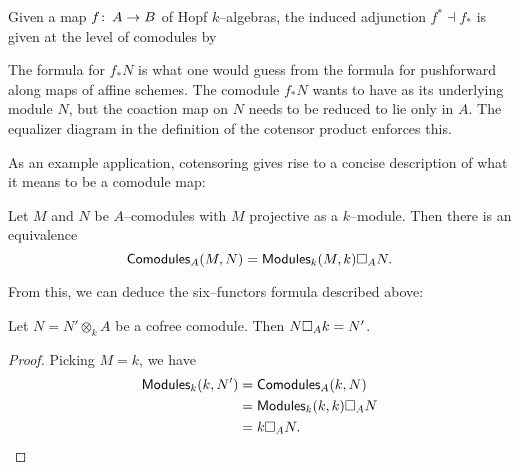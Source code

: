 \begin{lemma}
Given a map $f \colon\thinspace A \to B$ of Hopf $k$--algebras, the induced adjunction $f^* \dashv f_*$ is given at the level of comodules by
\begin{center}
\end{center}
\end{lemma}

\begin{remark}
The formula for $f_* N$ is what one would guess from the formula for pushforward along maps of affine schemes.  The comodule $f_* N$ wants to have as its underlying module $N$, but the coaction map on $N$ needs to be reduced to lie only in $A$.  The equalizer diagram in the definition of the cotensor product enforces this.
\end{remark}

\noindent As an example application, cotensoring gives rise to a concise description of what it means to be a comodule map:

\begin{lemma}
Let $M$ and $N$ be $A$--comodules with $M$ projective as a $k$--module.  Then there is an equivalence \[\CatOf{Comodules}_A(M, N) = \CatOf{Modules}_k(M, k) \cotensor_A N. \qed\]
\end{lemma}

\noindent From this, we can deduce the six--functors formula described above:

\begin{corollary}
Let $N = N' \otimes_k A$ be a cofree comodule. Then $N \square_A k = N'$.
\end{corollary}
\begin{proof}
Picking $M = k$, we have
\begin{align*}
\CatOf{Modules}_k(k, N') & = \CatOf{Comodules}_A(k, N) \\
& = \CatOf{Modules}_k(k, k) \cotensor_A N \\
& = k \cotensor_A N. \qed
\end{align*}
\end{proof}

